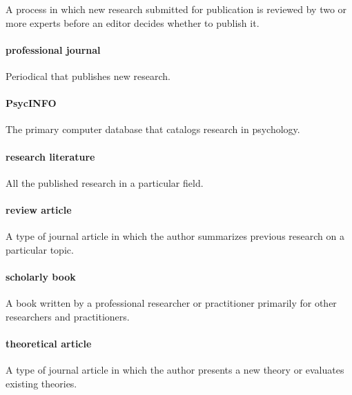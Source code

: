 \documentclass[
]{krantz}
\begin{document}
A process in which new research submitted for publication is reviewed by two or more experts before an editor decides whether to publish it.

\paragraph*{professional journal}\label{professional-journal}

Periodical that publishes new research.

\paragraph*{PsycINFO}\label{psycinfo}

The primary computer database that catalogs research in psychology.

\paragraph*{research literature}\label{research-literature}

All the published research in a particular field.

\paragraph*{review article}\label{review-article}

A type of journal article in which the author summarizes previous research on a particular topic.

\paragraph*{scholarly book}\label{scholarly-book}

A book written by a professional researcher or practitioner primarily for other researchers and practitioners.

\paragraph*{theoretical article}\label{theoretical-article}

A type of journal article in which the author presents a new theory or evaluates existing theories.
\end{document}
